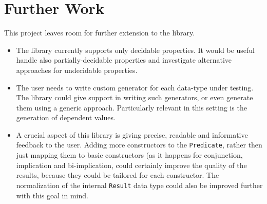 \documentclass[10pt,a4paper]{article}
\begin{document}
\section{Further Work}
This project leaves room for further extension to the library.
\begin{itemize}
	\item The library currently supports only decidable properties. It would be useful handle also partially-decidable properties and investigate alternative approaches for undecidable properties.
	\item The user needs to write custom generator for each data-type under testing. The library could give support in writing such generators, or even generate them using a generic approach. Particularly relevant in this setting is the generation of dependent values.
	\item A crucial aspect of this library is giving precise, readable and informative feedback to the user. Adding more constructors to the \texttt{Predicate}, rather then just mapping them to basic constructors (as it happens for conjunction, implication and bi-implication, could certainly improve the quality of the results, because they could be tailored for each constructor. The normalization of the internal \texttt{Result} data type could also be improved further with this goal in mind.
\end{itemize}
\end{document}

